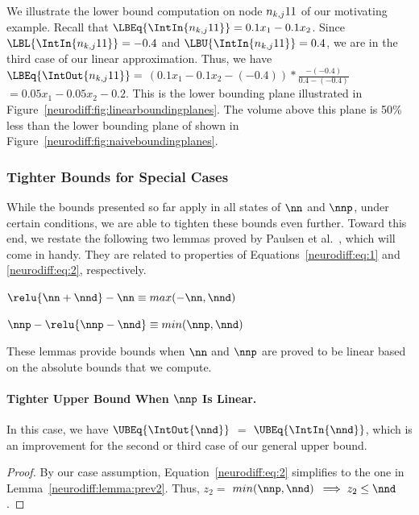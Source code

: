 We illustrate the lower bound computation on node $ n_{k,j}{1}{1} $ of our
motivating example. Recall that $ \LBEq{\IntIn{\n{1}{1}}} = 0.1x_1 -
0.1x_2 $. Since $ \LBL{\IntIn{\n{1}{1}}} = -0.4 $ and
$ \LBU{\IntIn{\n{1}{1}}} = 0.4 $, we are in the third case of our
linear approximation. Thus, we have $ \LBEq{\IntOut{\n{1}{1}}} = $ $
(0.1x_1 - 0.1x_2 - (-0.4))*\frac{-(-0.4)}{0.4 - (-0.4)} $$ = 0.05x_1 -
0.05x_2 - 0.2$. This is the lower bounding plane illustrated in
Figure~\ref{neurodiff:fig:linearboundingplanes}. The volume above this plane is
50\% less
than the lower bounding plane of \ReluDiff{} shown in
Figure~\ref{neurodiff:fig:naiveboundingplanes}.


\subsubsection{Tighter Bounds for Special Cases}
\label{neurodiff:sec:tighter}

While the bounds presented so far apply in all states of $ \nn $ and
$ \nnp $, under certain conditions, we are able to tighten these
bounds even further.
%
Toward this end, we restate the following two lemmas proved by Paulsen
et al.~\cite{paulsen2020reludiff}, which will come in handy.  They are related
to properties of Equations~\ref{neurodiff:eq:1} and \ref{neurodiff:eq:2},
respectively.
%
\begin{lemma} \label{neurodiff:lemma:prev1}
	$ \relu{{\nn} + {\nnd}} - \nn \equiv max(-\nn, \nnd)$
\end{lemma}
\begin{lemma} \label{neurodiff:lemma:prev2}
	$ \nnp - \relu{{\nnp} - {\nnd}} \equiv min(\nnp, \nnd)$
\end{lemma}
%
These lemmas provide bounds when $ \nn $ and $ \nnp $ are proved to be
linear based on the absolute bounds that we compute.

\paragraph{Tighter Upper Bound When $ \nnp $ Is Linear.}

In this case, we have $ \UBEq{\IntOut{\nnd}} $ $ = $
$ \UBEq{\IntIn{\nnd}}$, which is an improvement for the second or
third case of our general upper bound.

\begin{proof}
By our case assumption, Equation~\ref{neurodiff:eq:2} simplifies to the one in
Lemma~\ref{neurodiff:lemma:prev2}. Thus, $ z_2 =$ $ min(\nnp, \nnd) $ $\implies
z_2 \leq \nnd $.
\end{proof}

